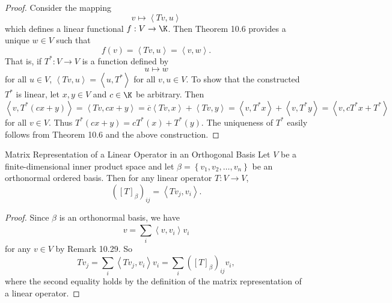 \documentclass[linearalgebra]{subfiles}
\begin{document}
    \begin{proof}
        Consider the mapping
        \begin{equation*}
            v\mapsto \left\langle Tv, u\right\rangle 
        \end{equation*}
        which defines a linear functional $f:V\to\K$. Then Theorem 10.6 provides a unique $w\in V$ such that
        \begin{equation*}
            f\left( v \right) = \left\langle Tv, u\right\rangle = \left\langle v, w\right\rangle .
        \end{equation*}
        That is, if $T^*:V\to V$ is a function defined by 
        \begin{equation*}
            u\mapsto w
        \end{equation*}
        for all $u\in V$, $\left\langle Tv, u\right\rangle = \left\langle u, T^*\right\rangle$ for all $v,u\in V$. To show that the constructed $T^*$ is linear, let $x,y\in V$ and $c\in\K$ be arbitrary. Then
        \begin{equation*}
            \left\langle v, T^*(cx+y)\right\rangle = \left\langle Tv, cx+y\right\rangle = \overline{c}\left\langle Tv, x\right\rangle + \left\langle Tv, y\right\rangle = \left\langle v, T^*x\right\rangle + \left\langle v, T^*y\right\rangle = \left\langle v, cT^*x+T^*\right\rangle 
        \end{equation*}
        for all $v\in V$. Thus $T^*(cx+y) = cT^*(x)+T^*(y)$. The uniqueness of $T^*$ easily follows from Theorem 10.6 and the above construction.
    \end{proof}

    \begin{prop}{Matrix Representation of a Linear Operator in an Orthogonal Basis}
        Let $V$ be a finite-dimensional inner product space and let $\beta = \left\lbrace v_1,v_2,\ldots,v_n \right\rbrace$ be an orthonormal ordered basis. Then for any linear operator $T:V\to V$,
        \begin{equation*}
            \left( \left[ T \right] _\beta \right) _{ij} = \left\langle Tv_j, v_i\right\rangle .
        \end{equation*}
    \end{prop}

    \begin{proof}
        Since $\beta$ is an orthonormal basis, we have
        \begin{equation*}
            v = \sum^{}_{i} \left\langle v, v_i\right\rangle v_i
        \end{equation*}
        for any $v\in V$ by Remark 10.29. So
        \begin{equation*}
            Tv_j = \sum^{}_{i} \left\langle Tv_j, v_i\right\rangle v_i = \sum^{}_{i} \left( \left[ T \right] _\beta \right) _{ij}v_i,
        \end{equation*}
        where the second equality holds by the definition of the matrix representation of a linear operator.
    \end{proof}
\end{document}
